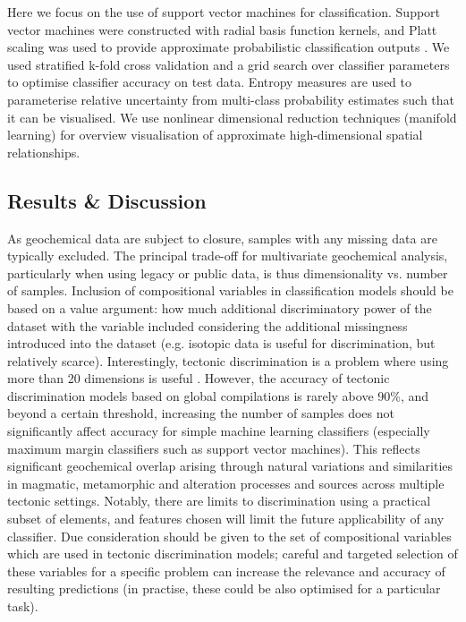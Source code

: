\documentclass[a4,10pt]{article}
\begin{document}
\begin{multicols*}{2}[]
	Here we focus on the use of support vector machines for classification. Support vector machines were constructed with radial basis function kernels, and Platt scaling was used to provide approximate probabilistic classification outputs \citep[][]{Platt2000, Lin2007}. We used stratified k-fold cross validation and a grid search over classifier parameters to optimise classifier accuracy on test data. Entropy measures are used to parameterise relative uncertainty from multi-class probability estimates such that it can be visualised. We use nonlinear dimensional reduction techniques (manifold learning) for overview visualisation of approximate high-dimensional spatial relationships. 
	
	\subsection*{Results \& Discussion}
	
	As geochemical data are subject to closure, samples with any missing data are typically excluded. The principal trade-off for multivariate geochemical analysis, particularly when using legacy or public data, is thus dimensionality vs. number of samples. Inclusion of compositional variables in classification models should be based on a value argument: how much additional discriminatory power of the dataset with the variable included considering the additional missingness introduced into the dataset (e.g. isotopic data is useful for discrimination, but relatively scarce). Interestingly, tectonic discrimination is a problem where using more than 20 dimensions is useful \citep[][]{Petrelli2016, Ueki2018}. However, the accuracy of tectonic discrimination models based on global compilations is rarely above 90\%, and beyond a certain threshold, increasing the number of samples does not significantly affect accuracy for simple machine learning classifiers (especially maximum margin classifiers such as support vector machines). This reflects significant geochemical overlap arising through natural variations and similarities in magmatic, metamorphic and alteration processes and sources across multiple tectonic settings. Notably, there are limits to discrimination using a practical subset of elements, and features chosen will limit the future applicability of any classifier. Due consideration should be given to the set of compositional variables which are used in tectonic discrimination models; careful and targeted selection of these variables for a specific problem can increase the relevance and accuracy of resulting predictions (in practise, these could be also optimised for a particular task).
	

\end{multicols*}
\end{document}
